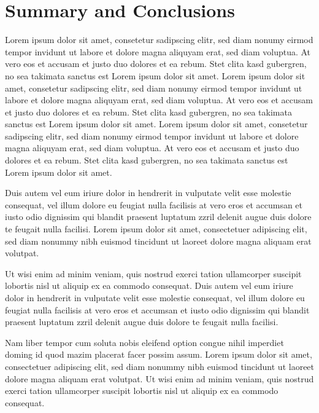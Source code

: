 %
\chapter{Summary and Conclusions}
\label{chap:conclusion}
%
Lorem ipsum dolor sit amet, consetetur sadipscing elitr, sed diam nonumy eirmod 
tempor invidunt ut labore et dolore magna aliquyam erat, sed diam voluptua. At 
vero eos et accusam et justo duo dolores et ea rebum. Stet clita kasd gubergren,
no sea takimata sanctus est Lorem ipsum dolor sit amet. Lorem ipsum dolor sit
amet, consetetur sadipscing elitr, sed diam nonumy eirmod tempor invidunt ut 
labore et dolore magna aliquyam erat, sed diam voluptua. At vero eos et accusam 
et justo duo dolores et ea rebum. Stet clita kasd gubergren, no sea takimata 
sanctus est Lorem ipsum dolor sit amet. Lorem ipsum dolor sit amet, consetetur 
sadipscing elitr, sed diam nonumy eirmod tempor invidunt ut labore et dolore 
magna aliquyam erat, sed diam voluptua. At vero eos et accusam et justo duo 
dolores et ea rebum. Stet clita kasd gubergren, no sea takimata sanctus est
Lorem ipsum dolor sit amet.

Duis autem vel eum iriure dolor in hendrerit in vulputate velit esse molestie 
consequat, vel illum dolore eu feugiat nulla facilisis at vero eros et accumsan 
et iusto odio dignissim qui blandit praesent luptatum zzril delenit augue duis 
dolore te feugait nulla facilisi. Lorem ipsum dolor sit amet, consectetuer 
adipiscing elit, sed diam nonummy nibh euismod tincidunt ut laoreet dolore magna
aliquam erat volutpat.

Ut wisi enim ad minim veniam, quis nostrud exerci tation ullamcorper suscipit 
lobortis nisl ut aliquip ex ea commodo consequat. Duis autem vel eum iriure 
dolor in hendrerit in vulputate velit esse molestie consequat, vel illum dolore 
eu feugiat nulla facilisis at vero eros et accumsan et iusto odio dignissim qui 
blandit praesent luptatum zzril delenit augue duis dolore te feugait nulla 
facilisi.

Nam liber tempor cum soluta nobis eleifend option congue nihil imperdiet doming 
id quod mazim placerat facer possim assum. Lorem ipsum dolor sit amet, 
consectetuer adipiscing elit, sed diam nonummy nibh euismod tincidunt ut 
laoreet dolore magna aliquam erat volutpat. Ut wisi enim ad minim veniam, quis 
nostrud exerci tation ullamcorper suscipit lobortis nisl ut aliquip ex ea 
commodo consequat.